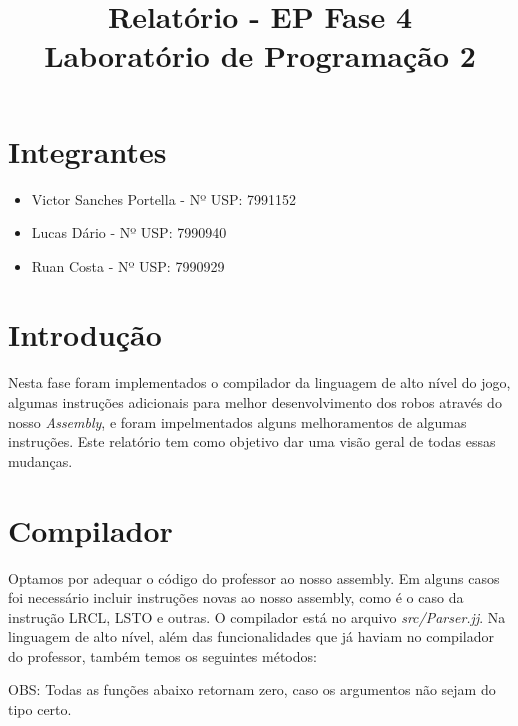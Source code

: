 \documentclass[11pt]{article}
\title{Relatório - EP Fase 4 \\ Laboratório de Programação 2}
\begin{document}
\maketitle

\section{Integrantes}

\begin{itemize}

\item Victor Sanches Portella - Nº USP: 7991152

\item Lucas Dário - Nº USP: 7990940

\item Ruan Costa - Nº USP: 7990929

\end{itemize}

\section{Introdução}

Nesta fase foram implementados o compilador da linguagem de alto nível do jogo, algumas instruções adicionais para melhor desenvolvimento dos robos através do nosso \emph{Assembly}, e foram impelmentados alguns melhoramentos de algumas instruções. Este relatório tem como objetivo dar uma visão geral de todas essas mudanças.

\section{Compilador}

Optamos por adequar o código do professor ao nosso assembly. Em alguns casos foi necessário incluir instruções novas ao nosso assembly, como é o caso da instrução LRCL, LSTO e outras. O compilador está no arquivo \emph{src/Parser.jj}.
Na linguagem de alto nível, além das funcionalidades que já haviam no compilador do professor, também temos os seguintes métodos:

OBS: Todas as funções abaixo retornam zero, caso os argumentos não sejam do tipo certo.
\end{document}
